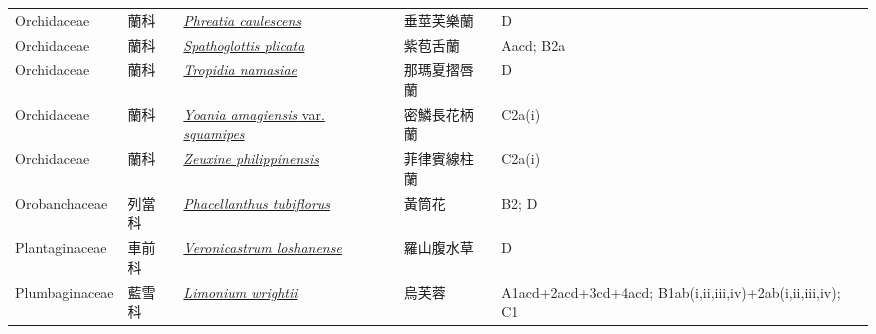 {\begin{longtable}{L{2.5cm}L{2cm}L{5cm}L{2.5cm}L{3cm}}
    Orchidaceae & 蘭科 & \href{http://www.theplantlist.org/tpl1.1/search?q=Phreatia+caulescens}{\textit{Phreatia caulescens} } & 垂莖芙樂蘭 & D    \\
    Orchidaceae & 蘭科 & \href{http://www.theplantlist.org/tpl1.1/search?q=Spathoglottis+plicata}{\textit{Spathoglottis plicata} } & 紫苞舌蘭 & Aacd; B2a    \\
    Orchidaceae & 蘭科 & \href{http://www.theplantlist.org/tpl1.1/search?q=Tropidia+namasiae}{\textit{Tropidia namasiae} } & 那瑪夏摺唇蘭 & D    \\
    Orchidaceae & 蘭科 & \href{http://www.theplantlist.org/tpl1.1/search?q=Yoania+amagiensis+var.+squamipes}{\textit{Yoania amagiensis} var. \textit{squamipes} } & 密鱗長花柄蘭 & C2a(i)    \\
    Orchidaceae & 蘭科 & \href{http://www.theplantlist.org/tpl1.1/search?q=Zeuxine+philippinensis}{\textit{Zeuxine philippinensis} } & 菲律賓線柱蘭 & C2a(i)    \\
    Orobanchaceae & 列當科 & \href{http://www.theplantlist.org/tpl1.1/search?q=Phacellanthus+tubiflorus}{\textit{Phacellanthus tubiflorus} } & 黃筒花 & B2; D    \\
    Plantaginaceae & 車前科 & \href{http://www.theplantlist.org/tpl1.1/search?q=Veronicastrum+loshanense}{\textit{Veronicastrum loshanense} } & 羅山腹水草 & D    \\
    Plumbaginaceae & 藍雪科 & \href{http://www.theplantlist.org/tpl1.1/search?q=Limonium+wrightii}{\textit{Limonium wrightii} } & 烏芙蓉 & A1acd+2acd+3cd+4acd; B1ab(i,ii,iii,iv)+2ab(i,ii,iii,iv); C1    \\

\end{longtable}}
